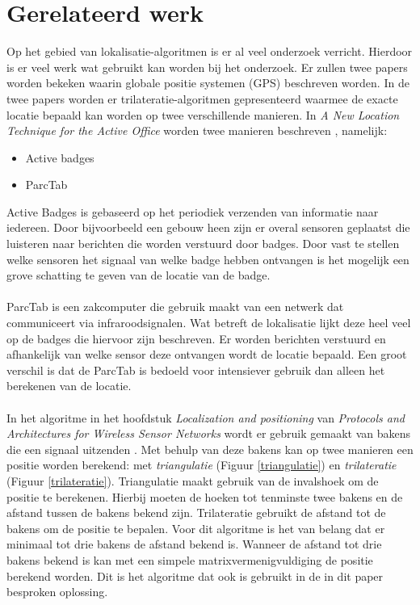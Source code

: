 \documentclass{article}
\begin{document}
\section{Gerelateerd werk}
Op het gebied van lokalisatie-algoritmen is er al veel onderzoek verricht. Hierdoor is er veel werk wat gebruikt kan worden bij het onderzoek. Er zullen twee papers worden bekeken waarin globale positie systemen (GPS) beschreven worden. In de twee papers worden er trilateratie-algoritmen gepresenteerd waarmee de exacte locatie bepaald kan worden op twee verschillende manieren. In \textit{A New Location Technique for the Active Office} worden twee manieren beschreven \cite{ward97}, namelijk:
\begin{itemize}
	\item Active badges
	\item ParcTab
\end{itemize}
Active Badges is gebaseerd op het periodiek verzenden van informatie naar iedereen. Door bijvoorbeeld een gebouw heen zijn er overal sensoren geplaatst die luisteren naar berichten die worden verstuurd door badges. Door vast te stellen welke sensoren het signaal van welke badge hebben ontvangen is het mogelijk een grove schatting te geven van de locatie van de badge.\\
\\
ParcTab is een zakcomputer die gebruik maakt van een netwerk dat communiceert via infraroodsignalen. Wat betreft de lokalisatie lijkt deze heel veel op de badges die hiervoor zijn beschreven. Er worden berichten verstuurd en afhankelijk van welke sensor deze ontvangen wordt de locatie bepaald. Een groot verschil is dat de ParcTab is bedoeld voor intensiever gebruik dan alleen het berekenen van de locatie. \\
\\
In het algoritme in het hoofdstuk \textit{Localization and positioning} van \textit{Protocols and Architectures for Wireless Sensor Networks} wordt er gebruik gemaakt van bakens die een signaal uitzenden \cite{h9}. Met behulp van deze bakens kan op twee manieren een positie worden berekend: met \emph{triangulatie} (Figuur \ref{triangulatie}) en \emph{trilateratie} (Figuur \ref{trilateratie}). Triangulatie maakt gebruik van de invalshoek om de positie te berekenen. Hierbij moeten de hoeken tot tenminste twee bakens en de afstand tussen de bakens bekend zijn. Trilateratie gebruikt de afstand tot de bakens om de positie te bepalen. Voor dit algoritme is het van belang dat er minimaal tot drie bakens de afstand bekend is. Wanneer de afstand tot drie bakens bekend is kan met een simpele matrixvermenigvuldiging de positie berekend worden. Dit is het algoritme dat ook is gebruikt in de in dit paper besproken oplossing.
\end{document}
